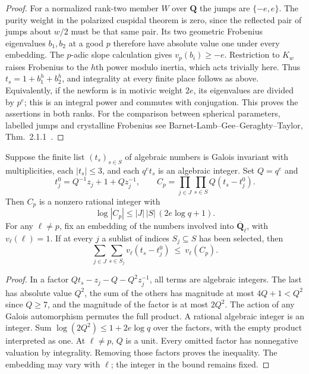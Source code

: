 \begin{proof}
For a normalized rank-two member \(W\) over \(\mathbf Q\) the jumps
are \(\{-e,e\}\). The purity weight in the polarized cuspidal theorem
is zero, since the reflected pair of jumps about \(w/2\) must be that
same pair. Its two geometric Frobenius eigenvalues \(b_1,b_2\) at a
good \(p\) therefore have absolute value one under every embedding.
The \(p\)-adic slope calculation gives \(v_p(b_i)\ge-e\). Restriction
to \(K_w\) raises Frobenius to the \(h\)th power modulo inertia, which
acts trivially here. Thus \(t_s=1+b_1^h+b_2^h\), and integrality at
every finite place follows as above. Equivalently, if the newform is
in motivic weight \(2e\), its eigenvalues are divided by \(p^e\);
this is an integral power and commutes with conjugation. This proves
the assertions in both ranks. For the comparison between spherical
parameters, labelled jumps and crystalline Frobenius see
Barnet-Lamb--Gee--Geraghty--Taylor,
Thm.~2.1.1~\cite{blggtPotential}.
\end{proof}

\begin{lemma}
Suppose the finite list\label{rk3:integer} \((t_s)_{s\in S}\) of algebraic numbers is
Galois invariant with multiplicities, each \(|t_s|\le3\), and each
\(q^et_s\) is an algebraic integer. Set \(Q=q^e\) and
\[
 t^0_j=Q^{-1}z_j+1+Qz_j^{-1},\qquad
 C_p=\prod_{j\in J}\prod_{s\in S}Q(t_s-t^0_j).
\]
Then \(C_p\) is a nonzero rational integer with
\[
 \log|C_p|\le |J|\,|S|\,(2e\log q+1).
\]
For any \(\ell\ne p\), fix an embedding of the numbers involved into
\(\overline{\mathbf Q}_\ell\), with \(v_\ell(\ell)=1\). If at every
\(j\) a sublist of indices \(S_j\subseteq S\) has been selected, then
\[
      \sum_{j\in J}\sum_{s\in S_j}v_\ell(t_s-t^0_j)
       \ \le\ v_\ell(C_p).
\]
\end{lemma}
\begin{proof}
In a factor \(Qt_s-z_j-Q-Q^2z_j^{-1}\), all terms are algebraic
integers. The last has absolute value \(Q^2\), the sum of the others
has magnitude at most \(4Q+1<Q^2\) since \(Q\ge7\), and the magnitude
of the factor is at most \(2Q^2\). The action of any Galois automorphism
permutes the full product. A rational algebraic integer is an integer.
Sum \(\log(2Q^2)\le1+2e\log q\) over the factors, with the empty product
interpreted as one. At \(\ell\ne p\), \(Q\) is a unit. Every omitted
factor has nonnegative valuation by integrality. Removing those factors
proves the inequality. The embedding may vary with \(\ell\); the integer
in the bound remains fixed.
\end{proof}

